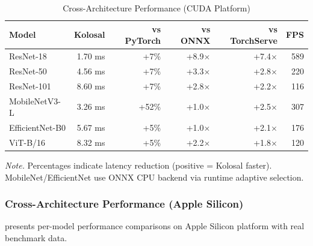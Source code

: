 \documentclass[10pt,twocolumn,a4paper]{article}
\theoremstyle{definition}
\theoremstyle{plain}
\begin{document}
\begin{table}[t]
\centering
\caption{Cross-Architecture Performance (CUDA Platform)}
\label{tab:cross_arch_cuda}
\scriptsize
\setlength{\tabcolsep}{2.5pt}
\begin{tabular}{@{}lrrrrr@{}}
\toprule
\textbf{Model} & \textbf{Kolosal} & \textbf{vs PyTorch} & \textbf{vs ONNX} & \textbf{vs TorchServe} & \textbf{FPS} \\
\midrule
ResNet-18 & 1.70 ms & +7\% & +8.9$\times$ & +7.4$\times$ & 589 \\
ResNet-50 & 4.56 ms & +7\% & +3.3$\times$ & +2.8$\times$ & 220 \\
ResNet-101 & 8.60 ms & +7\% & +2.8$\times$ & +2.2$\times$ & 116 \\
MobileNetV3-L & 3.26 ms & +52\% & +1.0$\times$ & +2.5$\times$ & 307 \\
EfficientNet-B0 & 5.67 ms & +5\% & +1.0$\times$ & +2.1$\times$ & 176 \\
ViT-B/16 & 8.32 ms & +5\% & +2.2$\times$ & +1.8$\times$ & 120 \\
\bottomrule
\end{tabular}

\vspace{0.5em}
\noindent\textit{Note.} Percentages indicate latency reduction (positive = Kolosal faster). MobileNet/EfficientNet use ONNX CPU backend via runtime adaptive selection.
\end{table}

\subsubsection{Cross-Architecture Performance (Apple Silicon)}

 presents per-model performance comparisons on Apple Silicon platform with real benchmark data.
\end{document}
